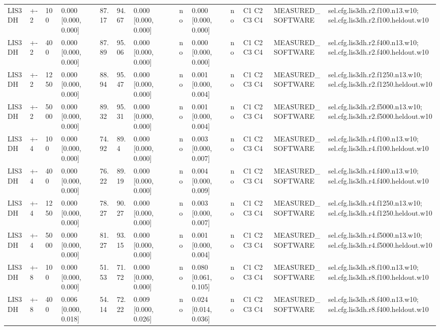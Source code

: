 \begin{table}[t]
\begin{tabular}{llllllllllllll}
LIS3DH & +-2 & 100 & 0.000 [0.000, 0.000] & 87.17 & 94.67 & 0.000 [0.000, 0.000] &  & no & 0.000 [0.000, 0.000] & no & C1 C2 C3 C4 & MEASURED\_SOFTWARE & sel.cfg.lis3dh.r2.f100.n13.w10; sel.cfg.lis3dh.r2.f100.heldout.w10 \\
LIS3DH & +-2 & 400 & 0.000 [0.000, 0.000] & 87.89 & 95.06 & 0.000 [0.000, 0.000] &  & no & 0.000 [0.000, 0.000] & no & C1 C2 C3 C4 & MEASURED\_SOFTWARE & sel.cfg.lis3dh.r2.f400.n13.w10; sel.cfg.lis3dh.r2.f400.heldout.w10 \\
LIS3DH & +-2 & 1250 & 0.000 [0.000, 0.000] & 88.94 & 95.47 & 0.000 [0.000, 0.000] &  & no & 0.001 [0.000, 0.004] & no & C1 C2 C3 C4 & MEASURED\_SOFTWARE & sel.cfg.lis3dh.r2.f1250.n13.w10; sel.cfg.lis3dh.r2.f1250.heldout.w10 \\
LIS3DH & +-2 & 5000 & 0.000 [0.000, 0.000] & 89.32 & 95.31 & 0.000 [0.000, 0.000] &  & no & 0.001 [0.000, 0.004] & no & C1 C2 C3 C4 & MEASURED\_SOFTWARE & sel.cfg.lis3dh.r2.f5000.n13.w10; sel.cfg.lis3dh.r2.f5000.heldout.w10 \\
LIS3DH & +-4 & 100 & 0.000 [0.000, 0.000] & 74.92 & 89.4 & 0.000 [0.000, 0.000] &  & no & 0.003 [0.000, 0.007] & no & C1 C2 C3 C4 & MEASURED\_SOFTWARE & sel.cfg.lis3dh.r4.f100.n13.w10; sel.cfg.lis3dh.r4.f100.heldout.w10 \\
LIS3DH & +-4 & 400 & 0.000 [0.000, 0.000] & 76.22 & 89.19 & 0.000 [0.000, 0.000] &  & no & 0.004 [0.000, 0.009] & no & C1 C2 C3 C4 & MEASURED\_SOFTWARE & sel.cfg.lis3dh.r4.f400.n13.w10; sel.cfg.lis3dh.r4.f400.heldout.w10 \\
LIS3DH & +-4 & 1250 & 0.000 [0.000, 0.000] & 78.27 & 90.27 & 0.000 [0.000, 0.000] &  & no & 0.003 [0.000, 0.007] & no & C1 C2 C3 C4 & MEASURED\_SOFTWARE & sel.cfg.lis3dh.r4.f1250.n13.w10; sel.cfg.lis3dh.r4.f1250.heldout.w10 \\
LIS3DH & +-4 & 5000 & 0.000 [0.000, 0.000] & 81.27 & 93.15 & 0.000 [0.000, 0.000] &  & no & 0.001 [0.000, 0.004] & no & C1 C2 C3 C4 & MEASURED\_SOFTWARE & sel.cfg.lis3dh.r4.f5000.n13.w10; sel.cfg.lis3dh.r4.f5000.heldout.w10 \\
LIS3DH & +-8 & 100 & 0.000 [0.000, 0.000] & 51.53 & 71.72 & 0.000 [0.000, 0.000] &  & no & 0.080 [0.061, 0.105] & no & C1 C2 C3 C4 & MEASURED\_SOFTWARE & sel.cfg.lis3dh.r8.f100.n13.w10; sel.cfg.lis3dh.r8.f100.heldout.w10 \\
LIS3DH & +-8 & 400 & 0.006 [0.000, 0.018] & 54.14 & 72.22 & 0.009 [0.000, 0.026] &  & no & 0.024 [0.014, 0.036] & no & C1 C2 C3 C4 & MEASURED\_SOFTWARE & sel.cfg.lis3dh.r8.f400.n13.w10; sel.cfg.lis3dh.r8.f400.heldout.w10 \\

\end{tabular}
\end{table}
